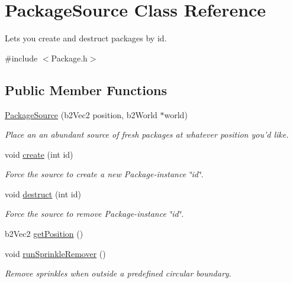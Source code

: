 \hypertarget{classPackageSource}{\section{Package\-Source Class Reference}
\label{classPackageSource}
}


Lets you create and destruct packages by id.  




{\ttfamily \#include $<$Package.\-h$>$}

\subsection*{Public Member Functions}
\begin{DoxyCompactItemize}
\item 
\hyperlink{classPackageSource_a75d7eb22a706e19fc5b3ea7dff41f355}{Package\-Source} (b2\-Vec2 position, b2\-World $\ast$world)
\begin{DoxyCompactList}\small\item\em Place an an abundant source of fresh packages at whatever position you'd like. \end{DoxyCompactList}\item 
void \hyperlink{classPackageSource_a5ab1ae46769749957c00bc1f321d624b}{create} (int id)
\begin{DoxyCompactList}\small\item\em Force the source to create a new Package-\/instance \char`\"{}id\char`\"{}. \end{DoxyCompactList}\item 
void \hyperlink{classPackageSource_a206fd1922f6bed7d2647d21dffa1fc9b}{destruct} (int id)
\begin{DoxyCompactList}\small\item\em Force the source to remove Package-\/instance \char`\"{}id\char`\"{}. \end{DoxyCompactList}\item 
b2\-Vec2 \hyperlink{classPackageSource_a02f12883ffb207ff3e2921fff9abc256}{get\-Position} ()
\item 
void \hyperlink{classPackageSource_aa6cb8fe5b1912705b0258f2a40f3791b}{run\-Sprinkle\-Remover} ()
\begin{DoxyCompactList}\small\item\em Remove sprinkles when outside a predefined circular boundary. \end{DoxyCompactList}\end{DoxyCompactItemize}
